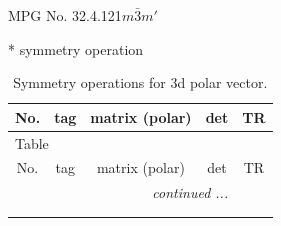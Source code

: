 \documentclass[fleqn,8pt]{jsarticle}
\begin{document}
\setcounter{MaxMatrixCols}{32}

\renewcommand{\tablename}{Table~}
\renewcommand{\figurename}{Figure~}
\begin{center}
\LARGE
MPG No. 32.4.121\quad$m\bar{3}m'$
\end{center}
* symmetry operation
\renewcommand{\arraystretch}{1.3}
\begin{longtable}{ccccc}
\caption{Symmetry operations for 3d polar vector.}
 \\
 \hline \hline
No. & tag & matrix (polar) & det & TR \\ \hline \endfirsthead

\multicolumn{4}{l}{\tablename\ \thetable{}} \\
 \hline \hline
No. & tag & matrix (polar) & det & TR \\ \hline \endhead

 \hline \hline
\multicolumn{4}{r}{\footnotesize\it continued ...} \\ \endfoot

 \hline \hline
\multicolumn{4}{r}{} \\ \endlastfoot


\end{longtable}
\end{document}
